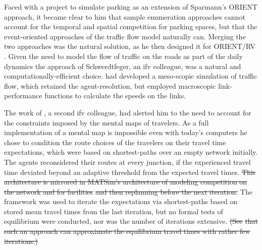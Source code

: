 Faced with a project to simulate parking as an extension of Sparmann's ORIENT approach, it became clear to him that sample enumeration approaches cannot account for the temporal and spatial competition for parking spaces, but that the event-oriented approaches of the traffic flow model naturally can. 
Merging the two approaches was the natural solution, as he then designed it for ORIENT/RV \citep[][]{Axhausen_TechRep_IFV_1989}. 
Given the need to model the flow of traffic on the roads as part of the daily dynamics the approach of Schwerdtfeger, an \gls{ifv} colleague, was a natural and computationally-efficient choice. 
\citet[][]{Schwerdtfeger_VolmulerHamerslag_1984} had developed a meso-scopic simulation of traffic flow, which retained the agent-resolution, but employed macroscopic link-performance functions to calculate the speeds on the links. 

The work of \citet[][]{Swiderski_CarpenterJones_1983}, a second \gls{ifv} colleague, had alerted him to the need to account for the constraints imposed by the mental maps of travelers. As a full implementation of a mental map is impossible even with today's computers he chose to condition the route choices of the travelers on their travel time expectations, which were based on shortest-paths over an empty network initially. The agents reconsidered their routes at every junction, if the experienced travel time deviated beyond an adaptive threshold from the expected travel times. 
%
\st{This architecture is mirrored in MATSim's architecture of modeling competition  on the network and for facilities} \textcolor{gray}{\tiny \citep[][]{HorniEtAl_TRR_2009}} \st{and then replanning before the next iteration.}   The framework was used to iterate \citep[][]{Axhausen_Jones_1990} the expectations via shortest-paths based on stored mean travel times from the last iteration, but no formal tests of equilibrium were conducted, nor was the number of iterations extensive. \st{(See} \textcolor{gray}{\tiny \citet[][]{Dobler_PhDThesis_2013}} \st{that such an approach can approximate the equilibrium travel times with rather few iterations.)}

